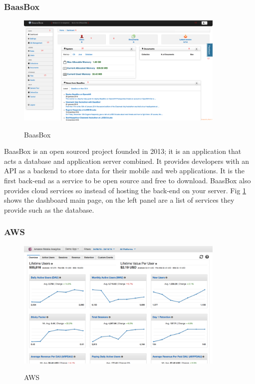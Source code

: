 \subsubsection{BaasBox}

\begin{figure}[!h]
    \caption{BaasBox}
    \centering
    \includegraphics[width=100mm]{images/baasbox}
    \label{fig:baasbox}
\end{figure}

BaasBox \cite{baasBox} is an open sourced project founded in 2013; it is an application that acts a database and application server combined. It provides developers with an API as a backend to store data for their mobile and web applications. It is the first back-end as a service to be open source and free to download. BaasBox also provides cloud services so instead of hosting the back-end on your server. Fig \ref{fig:baasbox} shows the dashboard main page, on the left panel are a list of services they provide such as the database.

\subsubsection{AWS}

\begin{figure}[!h]
    \caption{AWS}
    \centering
    \includegraphics[width=100mm]{images/aws}
    \label{fig:aws}
\end{figure}

